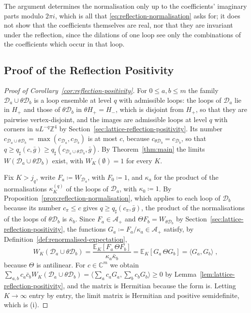 \documentclass[11pt]{preprint}
\numberwithin{equation}{section}
\theoremstyle{definition}
\theoremstyle{remark}
\theoremstyle{plain}
\begin{document}
The argument determines the normalisation only up to the coefficients' imaginary parts modulo $2\pi i$, which is all that \eqref{eq:reflection-normalisation} asks for; it does not show that the coefficients themselves are real, nor that they are invariant under the reflection, since the dilations of one loop see only the combinations of the coefficients which occur in that loop.

\subsection{Proof of the Reflection Positivity}\label{sec:proof-reflection-positivity}

\begin{proof}[Proof of Corollary~\ref{cor:reflection-positivity}]
For $0 \leq a, b \leq m$ the family $\mathcal D_a \cup \theta\mathcal D_b$ is a loop ensemble at level $q$ with admissible loops: the loops of $\mathcal D_a$ lie in $H_+$ and those of $\theta\mathcal D_b$ in $\theta H_+ = H_-$, which is disjoint from $H_+$, so that they are pairwise vertex-disjoint, and the images are admissible loops at level $q$ with corners in $uL^{-q}\mathbb Z^4$ by Section~\ref{sec:lattice-reflection-positivity}. Its number $c_{\mathcal D_a \cup \theta\mathcal D_b} = \max(c_{\mathcal D_a}, c_{\mathcal D_b})$ is at most $c$, because $c_{\theta\mathcal D_b} = c_{\mathcal D_b}$, so that $q \geq q_\sharp(c, \bar g) \geq q_\sharp(c_{\mathcal D_a \cup \theta\mathcal D_b}, \bar g)$. By Theorem~\ref{thm:main} the limits $W(\mathcal D_a \cup \theta\mathcal D_b)$ exist, with $W_K(\emptyset) = 1$ for every $K$.

Fix $K > j_q$, write $F_a \coloneqq W_{\mathcal D_a}$, with $F_0 \coloneqq 1$, and $\kappa_a$ for the product of the normalisations $\kappa^{(q)}_K$ of the loops of $\mathcal D_a$, with $\kappa_0 \coloneqq 1$. By Proposition~\ref{prop:reflection-normalisation}, which applies to each loop of $\mathcal D_b$ because its number $c_\pi \leq c$ gives $q \geq q_\sharp(c_\pi, \bar g)$, the product of the normalisations of the loops of $\theta\mathcal D_b$ is $\bar\kappa_b$. Since $F_a \in \mathcal A_+$ and $\Theta F_b = W_{\theta\mathcal D_b}$ by Section~\ref{sec:lattice-reflection-positivity}, the functions $G_a \coloneqq F_a/\kappa_a \in \mathcal A_+$ satisfy, by Definition~\ref{def:renormalised-expectation},
\begin{equation}\label{eq:gram-identity}
    W_K(\mathcal D_a \cup \theta\mathcal D_b) = \frac{\mathbb E_K[F_a\,\Theta F_b]}{\kappa_a\bar\kappa_b} = \mathbb E_K[G_a\,\Theta G_b] = \langle G_a, G_b\rangle\;,
\end{equation}
because $\Theta$ is antilinear. For $c \in \mathbb C^m$ we obtain $\sum_{a,b}c_a\bar c_bW_K(\mathcal D_a \cup \theta\mathcal D_b) = \langle\sum_ac_aG_a, \sum_bc_bG_b\rangle \geq 0$ by Lemma~\ref{lem:lattice-reflection-positivity}, and the matrix is Hermitian because the form is. Letting $K \to \infty$ entry by entry, the limit matrix is Hermitian and positive semidefinite, which is (i).


\end{proof}
\end{document}
